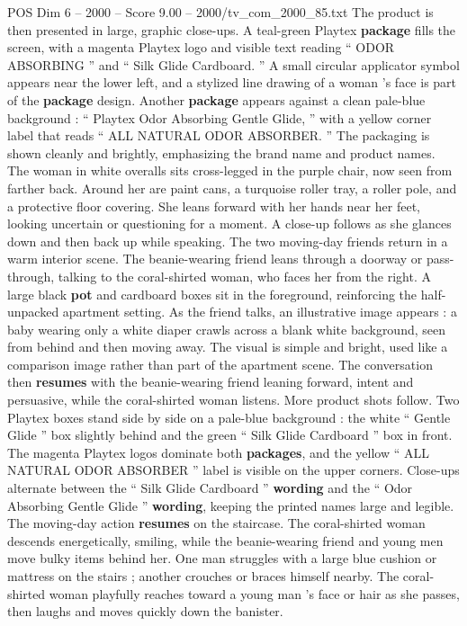 \begin{textsample}{POS Dim 6 – 2000 – Score 9.00 – 2000/tv\_com\_2000\_85.txt}
The product is then presented in large, graphic close-ups.
A teal-green Playtex \textbf{package} fills the screen, with a magenta Playtex logo and visible text reading “ ODOR ABSORBING ” and “ Silk Glide Cardboard. ” A small circular applicator symbol appears near the lower left, and a stylized line drawing of a woman ’s face is part of the \textbf{package} design.
Another \textbf{package} appears against a clean pale-blue background : “ Playtex Odor Absorbing Gentle Glide, ” with a yellow corner label that reads “ ALL NATURAL ODOR ABSORBER. ” The packaging is shown cleanly and brightly, emphasizing the brand name and product names.
The woman in white overalls sits cross-legged in the purple chair, now seen from farther back.
Around her are paint cans, a turquoise roller tray, a roller pole, and a protective floor covering.
She leans forward with her hands near her feet, looking uncertain or questioning for a moment.
A close-up follows as she glances down and then back up while speaking.
The two moving-day friends return in a warm interior scene.
The beanie-wearing friend leans through a doorway or pass-through, talking to the coral-shirted woman, who faces her from the right.
A large black \textbf{pot} and cardboard boxes sit in the foreground, reinforcing the half-unpacked apartment setting.
As the friend talks, an illustrative image appears : a baby wearing only a white diaper crawls across a blank white background, seen from behind and then moving away.
The visual is simple and bright, used like a comparison image rather than part of the apartment scene.
The conversation then \textbf{resumes} with the beanie-wearing friend leaning forward, intent and persuasive, while the coral-shirted woman listens.
More product shots follow.
Two Playtex boxes stand side by side on a pale-blue background : the white “ Gentle Glide ” box slightly behind and the green “ Silk Glide Cardboard ” box in front.
The magenta Playtex logos dominate both \textbf{packages}, and the yellow “ ALL NATURAL ODOR ABSORBER ” label is visible on the upper corners.
Close-ups alternate between the “ Silk Glide Cardboard ” \textbf{wording} and the “ Odor Absorbing Gentle Glide ” \textbf{wording}, keeping the printed names large and legible.
The moving-day action \textbf{resumes} on the staircase.
The coral-shirted woman descends energetically, smiling, while the beanie-wearing friend and young men move bulky items behind her.
One man struggles with a large blue cushion or mattress on the stairs ; another crouches or braces himself nearby.
The coral-shirted woman playfully reaches toward a young man ’s face or hair as she passes, then laughs and moves quickly down the banister.

\end{textsample}
